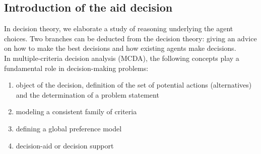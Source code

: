 \documentclass{report}
\begin{document}
\subsection{Introduction of the aid decision}
In decision theory, we elaborate a study of reasoning underlying the agent choices. Two branches can be deducted from the decision theory: giving an advice on how to make the best decisions and how existing agents make decisions. \\
In multiple-criteria decision analysis (MCDA), the following concepts play a fundamental role in decision-making problems: 
\begin{enumerate}
\item object of the decision, definition of the set of potential actions (alternatives) and the determination of a problem statement
\item modeling a consistent family of criteria
\item defining a global preference model
\item decision-aid or decision support
\end{enumerate}
\end{document}
